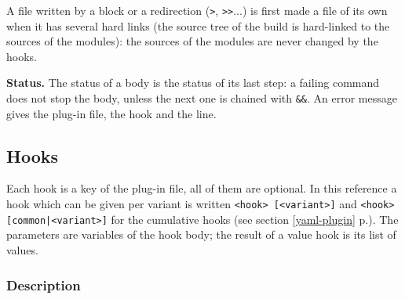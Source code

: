 \documentclass[a4paper,12pt,twoside]{article}
\newcommand{\code}[1]{\texttt{#1}}
\newcommand{\seeref}[1]{see section \ref{#1} p.\pageref{#1}}
\begin{document}
A file written by a block or a redirection (\code{>}, \code{>>}...) is
first made a file of its own when it has several hard links (the source
tree of the build is hard-linked to the sources of the modules): the
sources of the modules are never changed by the hooks.

\textbf{Status.} The status of a body is the status of its last step: a
failing command does not stop the body, unless the next one is chained with
\code{\&\&}. An error message gives the plug-in file, the hook and the
line.

\subsection{Hooks}
\label{hooks}

Each hook is a key of the plug-in file, all of them are optional. In
this reference a hook which can be given per variant is written
\code{<hook> [<variant>]} and \code{<hook> [common|<variant>]} for the
cumulative hooks (\seeref{yaml-plugin}). The parameters are variables
of the hook body; the result of a value hook is its list of values.

\subsubsection{Description}
\end{document}
